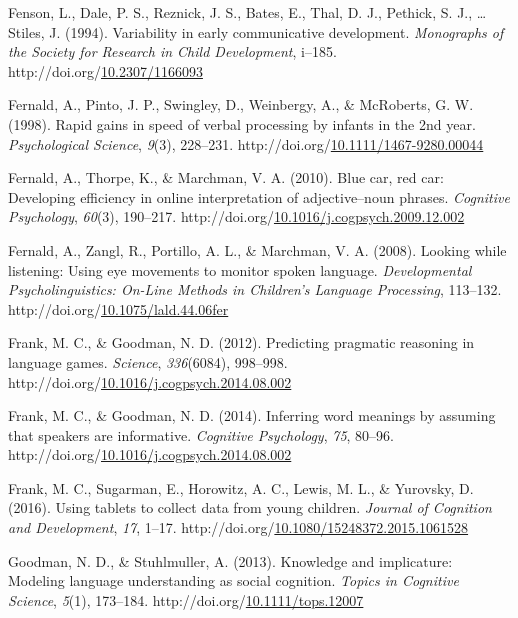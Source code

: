 \documentclass[a4paper,man,apacite,floatsintext]{apa6}
\begin{document}
Fenson, L., Dale, P. S., Reznick, J. S., Bates, E., Thal, D. J.,
Pethick, S. J., \ldots{} Stiles, J. (1994). Variability in early
communicative development. \emph{Monographs of the Society for Research
in Child Development}, i--185.
http://doi.org/\href{http://dx.doi.org/10.2307/1166093}{10.2307/1166093}

Fernald, A., Pinto, J. P., Swingley, D., Weinbergy, A., \& McRoberts, G.
W. (1998). Rapid gains in speed of verbal processing by infants in the
2nd year. \emph{Psychological Science}, \emph{9}(3), 228--231.
http://doi.org/\href{http://dx.doi.org/10.1111/1467-9280.00044}{10.1111/1467-9280.00044}

Fernald, A., Thorpe, K., \& Marchman, V. A. (2010). Blue car, red car:
Developing efficiency in online interpretation of adjective--noun
phrases. \emph{Cognitive Psychology}, \emph{60}(3), 190--217.
http://doi.org/\href{http://dx.doi.org/10.1016/j.cogpsych.2009.12.002}{10.1016/j.cogpsych.2009.12.002}

Fernald, A., Zangl, R., Portillo, A. L., \& Marchman, V. A. (2008).
Looking while listening: Using eye movements to monitor spoken language.
\emph{Developmental Psycholinguistics: On-Line Methods in Children's
Language Processing}, 113--132.
http://doi.org/\href{http://dx.doi.org/10.1075/lald.44.06fer}{10.1075/lald.44.06fer}

Frank, M. C., \& Goodman, N. D. (2012). Predicting pragmatic reasoning
in language games. \emph{Science}, \emph{336}(6084), 998--998.
http://doi.org/\href{http://dx.doi.org/10.1016/j.cogpsych.2014.08.002}{10.1016/j.cogpsych.2014.08.002}

Frank, M. C., \& Goodman, N. D. (2014). Inferring word meanings by
assuming that speakers are informative. \emph{Cognitive Psychology},
\emph{75}, 80--96.
http://doi.org/\href{http://dx.doi.org/10.1016/j.cogpsych.2014.08.002}{10.1016/j.cogpsych.2014.08.002}

Frank, M. C., Sugarman, E., Horowitz, A. C., Lewis, M. L., \& Yurovsky,
D. (2016). Using tablets to collect data from young children.
\emph{Journal of Cognition and Development}, \emph{17}, 1--17.
http://doi.org/\href{http://dx.doi.org/10.1080/15248372.2015.1061528}{10.1080/15248372.2015.1061528}

Goodman, N. D., \& Stuhlmuller, A. (2013). Knowledge and implicature:
Modeling language understanding as social cognition. \emph{Topics in
Cognitive Science}, \emph{5}(1), 173--184.
http://doi.org/\href{http://dx.doi.org/10.1111/tops.12007}{10.1111/tops.12007}
\end{document}

